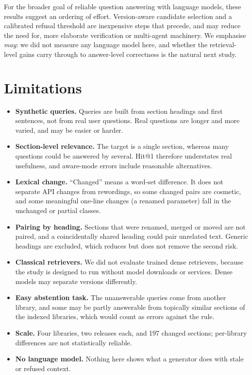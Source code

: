 \documentclass[11pt,a4paper]{article}
\begin{document}
For the broader goal of reliable question answering with language models, these results suggest an ordering of effort. Version-aware candidate selection and a calibrated refusal threshold are inexpensive steps that precede, and may reduce the need for, more elaborate
verification or multi-agent machinery. We emphasise \emph{may}: we did not measure any language model here, and whether the retrieval-level gains carry through to answer-level correctness is the natural next study.

\section{Limitations}
\label{sec:limits}
\begin{itemize}\setlength{\itemsep}{1pt}
\item \textbf{Synthetic queries.} Queries are built from section headings and first sentences, not from real user questions. Real questions are longer and more varied, and may be easier or harder.
\item \textbf{Section-level relevance.} The target is a single section, whereas many questions could be answered by several. Hit@1 therefore understates real usefulness, and aware-mode errors include reasonable alternatives.
\item \textbf{Lexical change.} ``Changed'' means a word-set difference. It does not separate API changes from rewordings, so some changed pairs are cosmetic, and some meaningful one-line changes (a renamed parameter) fall in the unchanged or partial classes.
\item \textbf{Pairing by heading.} Sections that were renamed, merged or moved are not paired, and a coincidentally shared heading could pair unrelated text. Generic headings are excluded, which reduces but does not remove the second risk.
\item \textbf{Classical retrievers.} We did not evaluate trained dense retrievers, because the study is designed to run without model downloads or services. Dense models may separate versions differently.
\item \textbf{Easy abstention task.} The unanswerable queries come from another library, and some may be partly answerable from topically similar sections of the indexed libraries, which would count as errors against the rule.
\item \textbf{Scale.} Four libraries, two releases each, and 197 changed sections; per-library differences are not statistically reliable.
\item \textbf{No language model.} Nothing here shows what a generator does with stale or refused context.
\end{itemize}
\end{document}
